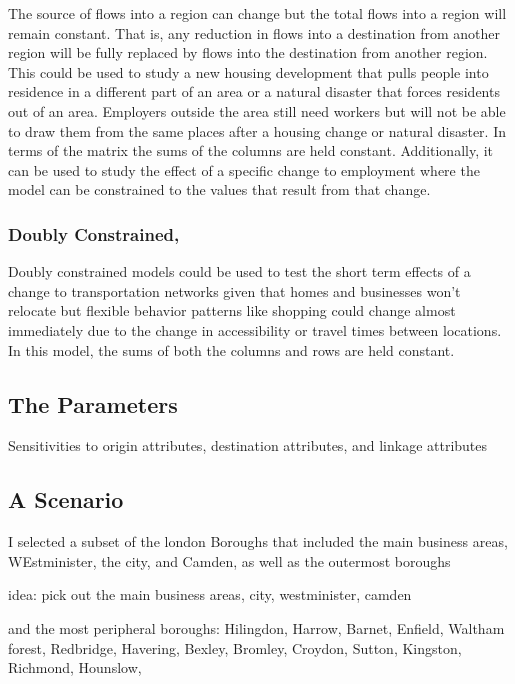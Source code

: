 \documentclass[11pt]{article} %
\begin{document}
The source of flows into a region can change but the total flows into a region will remain constant. That is, any reduction in flows into a destination from another region will be fully replaced by flows into the destination from another region.  This could be used to study a new housing development that pulls people into residence in a different part of an area or a natural disaster that forces residents out of an area. Employers outside the area still need workers but will not be able to draw them from the same places after a housing change or natural disaster. In terms of the matrix the sums of the columns are held constant. Additionally, it can be used to study the effect of a specific change to employment where the model can be constrained to the values that result from that change. 

\subsubsection{Doubly Constrained,}

Doubly constrained models could be used to test the short term effects of a change to transportation networks given that homes and businesses won't relocate but flexible behavior patterns like shopping could change almost immediately due to the change in accessibility or travel times between locations. In this model, the sums of both the columns and rows are held constant.

\subsection{The Parameters}



Sensitivities to origin attributes, destination attributes, and linkage attributes

\subsection{A Scenario}

I selected a subset of the london Boroughs that included the main business areas, WEstminister, the city, and Camden, as well as the outermost boroughs

idea: pick out the main business areas, city, westminister, camden 

and the most peripheral boroughs: Hilingdon, Harrow, Barnet, Enfield, Waltham forest, Redbridge, Havering, Bexley, Bromley, Croydon, Sutton, Kingston, Richmond, Hounslow, 
\end{document}

